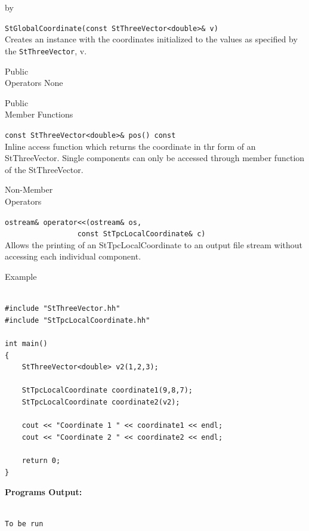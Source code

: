 \documentclass[twoside]{article}
\newcommand{\comp}[1]{\texttt{#1}}%
\newcommand{\entrylabel}[1]{\mbox{\textbf{{#1}}}\hfil}%
\newenvironment{entry}
{\begin{list}{}%
    {\renewcommand{\makelabel}{\entrylabel}%
     \setlength{\labelwidth}{90pt}%
     \setlength{\leftmargin}{\labelwidth}
     \advance\leftmargin by \labelsep%
      }%
    }%
  {\end{list}}
\newcommand{\Entrylabel}[1]%
{\raisebox{0pt}[1ex][0pt]{\makebox[\labelwidth][l]%
    {\parbox[t]{\labelwidth}{\hspace{0pt}\textbf{{#1}}}}}}
\newenvironment{Entry}%
{\renewcommand{\entrylabel}{\Entrylabel}\begin{entry}}%
  {\end{entry}}
\begin{document}
\begin{Entry}
   \verb+StGlobalCoordinate(const StThreeVector<double>& v)+\\
   Creates an instance with the coordinates initialized to
   the values as specified by the \comp{StThreeVector}, v.

\item[Public \\ Operators]
   None

\item[Public \\ Member Functions]

  \verb+const StThreeVector<double>& pos() const+\\
  Inline access function which returns the coordinate in thr
  form of an StThreeVector.  Single components can only be accessed
  through member function of the StThreeVector. 

\item[Non-Member \\ Operators]

  \verb+ostream& operator<<(ostream& os,+\\
  \verb+                 const StTpcLocalCoordinate& c)+\\
  Allows the printing of an StTpcLocalCoordinate to an output file stream
  without accessing each individual component.

\item[Example]

{\footnotesize
\begin{verbatim}

#include "StThreeVector.hh"
#include "StTpcLocalCoordinate.hh"

int main()
{
    StThreeVector<double> v2(1,2,3);

    StTpcLocalCoordinate coordinate1(9,8,7);
    StTpcLocalCoordinate coordinate2(v2);
    
    cout << "Coordinate 1 " << coordinate1 << endl;
    cout << "Coordinate 2 " << coordinate2 << endl;

    return 0;
}
\end{verbatim}
}%
{\bf Programs Output:}
{\footnotesize
\begin{verbatim}

To be run

\end{verbatim}
} %

\end{Entry}
\clearpage

%
%
\end{document}
